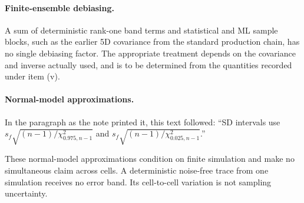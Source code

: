 \paragraph{Finite-ensemble debiasing.} A sum of deterministic rank-one band terms and statistical and ML sample blocks, such as the earlier 5D covariance from the standard production chain, has no single debiasing factor. The appropriate treatment depends on the covariance and inverse actually used, and is to be determined from the quantities recorded under item (v).

\paragraph{Normal-model approximations.} In the paragraph as the note printed it, this text followed: ``SD intervals use $s_f\sqrt{(n-1)/\chi^2_{0.975,n-1}}$ and $s_f\sqrt{(n-1)/\chi^2_{0.025,n-1}}$.''\par These normal-model approximations condition on finite simulation and make no simultaneous claim across cells. A deterministic noise-free trace from one simulation receives no error band. Its cell-to-cell variation is not sampling uncertainty.

